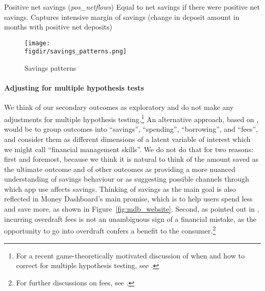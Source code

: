 Positive net savings (\textit{pos\_netflows})
Equal to net savings if there were positive net savings.
Captures intensive margin of savings (change in deposit amount in months with
positive net deposits)

\begin{figure}[H]
    \centering
    \caption{Savings patterns}%
    \texttt{[image: \\figdir/savings\_patterns.png]}
    \label{fig:\figdir/savings_patterns}

\end{figure}


\paragraph{Adjusting for multiple hypothesis tests}%
\label{par:adjusting_for_multiple_hypothesis_tests}
We think of our secondary outcomes as exploratory and do not make any
adjustments for multiple hypothesis testing.\footnote{For a recent
game-theoretically motivated discussion of when and how to correct for multiple
hypothesis testing, see \citet{viviano2021should}.} An alternative approach,
based on \citet{anderson2008multiple}, would be to group outcomes into
``savings'', ``spending'', ``borrowing'', and ``fees'', and consider them as
different dimensions of a latent variable of interest which we might call
``financial management skills''. We do not do that for two reasons: first and
foremost, because we think it is natural to think of the amount saved as the
ultimate outcome and of other outcomes as providing a more nuanced
understanding of savings behaviour or as suggesting possible channels through
which app use affects savings. Thinking of savings as the main goal is also
reflected in Money Dashboard's main promise, which is to help users spend less
and save more, as shown in Figure~\ref{fig:mdb_website}. Second, as pointed out
in \citet{carlin2017fintech}, incurring overdraft fees is not an unambiguous
sign of a financial mistake, as the opportunity to go into overdraft confers a
benefit to the consumer.\footnote{For further discussions on fees, see
\citet{jorring2020financial, stango2009consumers}.}


